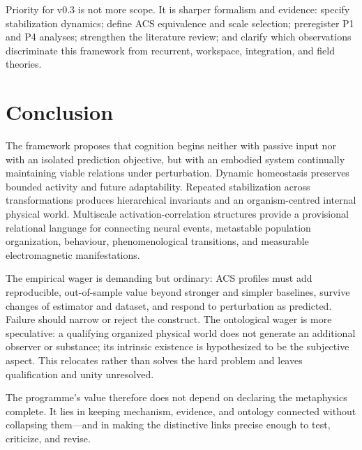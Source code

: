 \documentclass[
  11pt,
  a4paper,
]{article}
\begin{document}
Priority for v0.3 is not more scope. It is sharper formalism and
evidence: specify stabilization dynamics; define ACS equivalence and
scale selection; preregister P1 and P4 analyses; strengthen the
literature review; and clarify which observations discriminate this
framework from recurrent, workspace, integration, and field theories.

\section{Conclusion}\label{conclusion}

The framework proposes that cognition begins neither with passive input
nor with an isolated prediction objective, but with an embodied system
continually maintaining viable relations under perturbation. Dynamic
homeostasis preserves bounded activity and future adaptability. Repeated
stabilization across transformations produces hierarchical invariants
and an organism-centred internal physical world. Multiscale
activation-correlation structures provide a provisional relational
language for connecting neural events, metastable population
organization, behaviour, phenomenological transitions, and measurable
electromagnetic manifestations.

The empirical wager is demanding but ordinary: ACS profiles must add
reproducible, out-of-sample value beyond stronger and simpler baselines,
survive changes of estimator and dataset, and respond to perturbation as
predicted. Failure should narrow or reject the construct. The
ontological wager is more speculative: a qualifying organized physical
world does not generate an additional observer or substance; its
intrinsic existence is hypothesized to be the subjective aspect. This
relocates rather than solves the hard problem and leaves qualification
and unity unresolved.

The programme's value therefore does not depend on declaring the
metaphysics complete. It lies in keeping mechanism, evidence, and
ontology connected without collapsing them---and in making the
distinctive links precise enough to test, criticize, and revise.


\end{document}
